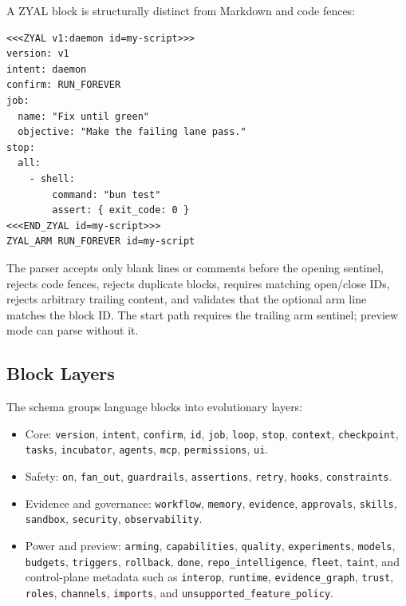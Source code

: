 \documentclass[conference]{IEEEtran}
\newcommand{\ZYAL}{ZYAL}
\begin{document}
A \ZYAL{} block is structurally distinct from Markdown and code fences:

\begin{verbatim}
<<<ZYAL v1:daemon id=my-script>>>
version: v1
intent: daemon
confirm: RUN_FOREVER
job:
  name: "Fix until green"
  objective: "Make the failing lane pass."
stop:
  all:
    - shell:
        command: "bun test"
        assert: { exit_code: 0 }
<<<END_ZYAL id=my-script>>>
ZYAL_ARM RUN_FOREVER id=my-script
\end{verbatim}

The parser accepts only blank lines or comments before the opening sentinel, rejects code fences, rejects duplicate blocks, requires matching open/close IDs, rejects arbitrary trailing content, and validates that the optional arm line matches the block ID. The start path requires the trailing arm sentinel; preview mode can parse without it.

\subsection{Block Layers}

The schema groups language blocks into evolutionary layers:

\begin{itemize}
  \item Core: \texttt{version}, \texttt{intent}, \texttt{confirm}, \texttt{id}, \texttt{job}, \texttt{loop}, \texttt{stop}, \texttt{context}, \texttt{checkpoint}, \texttt{tasks}, \texttt{incubator}, \texttt{agents}, \texttt{mcp}, \texttt{permissions}, \texttt{ui}.
  \item Safety: \texttt{on}, \texttt{fan\_out}, \texttt{guardrails}, \texttt{assertions}, \texttt{retry}, \texttt{hooks}, \texttt{constraints}.
  \item Evidence and governance: \texttt{workflow}, \texttt{memory}, \texttt{evidence}, \texttt{approvals}, \texttt{skills}, \texttt{sandbox}, \texttt{security}, \texttt{observability}.
  \item Power and preview: \texttt{arming}, \texttt{capabilities}, \texttt{quality}, \texttt{experiments}, \texttt{models}, \texttt{budgets}, \texttt{triggers}, \texttt{rollback}, \texttt{done}, \texttt{repo\_intelligence}, \texttt{fleet}, \texttt{taint}, and control-plane metadata such as \texttt{interop}, \texttt{runtime}, \texttt{evidence\_graph}, \texttt{trust}, \texttt{roles}, \texttt{channels}, \texttt{imports}, and \texttt{unsupported\_feature\_policy}.
\end{itemize}
\end{document}
